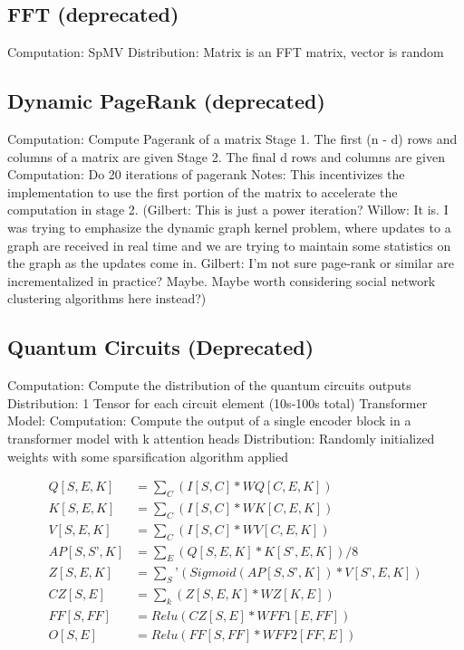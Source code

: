 \subsection{FFT (deprecated)}
	Computation: SpMV
	Distribution: Matrix is an FFT matrix, vector is random

\subsection{Dynamic PageRank (deprecated)}
	Computation: Compute Pagerank of a matrix
	Stage 1.
		The first (n - d) rows and columns of a matrix are given
	Stage 2.
		The final d rows and columns are given
	Computation:
		Do 20 iterations of pagerank
	Notes: This incentivizes the implementation to use the first portion of the matrix to accelerate the computation in stage 2.
(Gilbert: This is just a power iteration? Willow: It is. I was trying to emphasize the dynamic graph kernel problem, where updates to a graph are received in real time and we are trying to maintain some statistics on the graph as the updates come in. Gilbert: I'm not sure page-rank or similar are incrementalized in practice?  Maybe.  Maybe worth considering social network clustering algorithms here instead?)

\subsection{Quantum Circuits (Deprecated)}
	Computation: Compute the distribution of the quantum circuits outputs
	Distribution: 1 Tensor for each circuit element (10s-100s total)
Transformer Model:
	Computation: Compute the output of a single encoder block in a transformer model with k attention heads
	Distribution: Randomly initialized weights with some sparsification algorithm applied
 
 \begin{align*}
Q[S, E, K] &= \sum_C(I[S, C] * WQ[C, E, K])\\
K[S, E, K] &= \sum_C(I[S, C] * WK[C, E, K])\\
V[S, E, K] &= \sum_C(I[S, C] * WV[C, E, K])\\
AP[S, S’, K] &= \sum_E(Q[S, E, K] * K[S’, E, K]) / 8\\
Z[S, E, K] &= \sum_S’(Sigmoid(AP[S,S’,K]) * V[S’, E, K])\\
CZ[S, E] &= \sum_k(Z[S, E, K] * WZ[K,E])\\
FF[S,FF] &= Relu(CZ[S,E] * WFF1[E,FF])\\
O[S,E] &= Relu(FF[S,FF] * WFF2[FF,E])\\
\end{align*}

